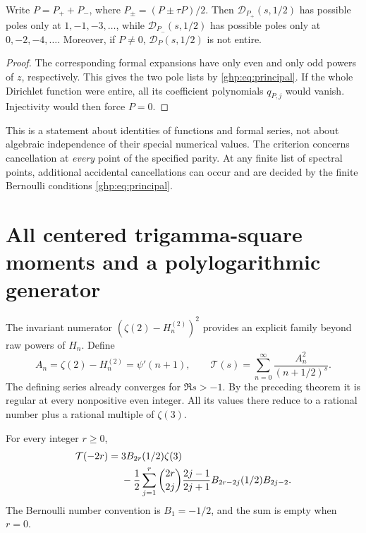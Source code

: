 \begin{corollary}\label{ghp:cor:split}
Write $P=P_++P_-$, where $P_\pm=(P\pm\tau P)/2$. Then
$\mathcal D_{P_+}(s,1/2)$ has possible poles only at
$1,-1,-3,\ldots$, while $\mathcal D_{P_-}(s,1/2)$ has possible poles
only at $0,-2,-4,\ldots$. Moreover, if $P\ne0$,
$\mathcal D_P(s,1/2)$ is not entire.
\end{corollary}
\begin{proof}
The corresponding formal expansions have only even and only odd
powers of $z$, respectively. This gives the two pole lists by
\eqref{ghp:eq:principal}. If the whole Dirichlet function were entire,
all its coefficient polynomials $q_{P,j}$ would vanish. Injectivity
would then force $P=0$.
\end{proof}

This is a statement about identities of functions and formal series,
not about algebraic independence of their special numerical values.
The criterion concerns cancellation at \emph{every} point of the
specified parity. At any finite list of spectral points, additional
accidental cancellations can occur and are decided by the finite
Bernoulli conditions \eqref{ghp:eq:principal}.

\section{All centered trigamma-square moments and a polylogarithmic generator}
\label{ghp:square:sec}

The invariant numerator $(\zeta(2)-H_n^{(2)})^2$ provides an explicit
family beyond raw powers of $H_n$. Define
\begin{equation}\label{ghp:def:square}
 A_n=\zeta(2)-H_n^{(2)}=\psi'(n+1),\qquad
 \mathcal T(s)=\sum_{n=0}^{\infty}\frac{A_n^2}{(n+1/2)^s}.
\end{equation}
The defining series already converges for $\Re s>-1$. By the preceding
theorem it is regular at every nonpositive even integer. All its values
there reduce to a rational number plus a rational multiple of
$\zeta(3)$.

\begin{theorem}
\label{ghp:thm:square}
For every integer $r\geq0$,
\begin{align}\label{ghp:eq:all-square}
 \mathcal T(-2r)={}&3B_{2r}(1/2)\zeta(3)\notag\\
 &-\frac12\sum_{j=1}^{r}\binom{2r}{2j}
   \frac{2j-1}{2j+1}B_{2r-2j}(1/2)B_{2j-2}.
\end{align}
The Bernoulli number convention is $B_1=-1/2$, and the sum is empty
when $r=0$.
\end{theorem}

